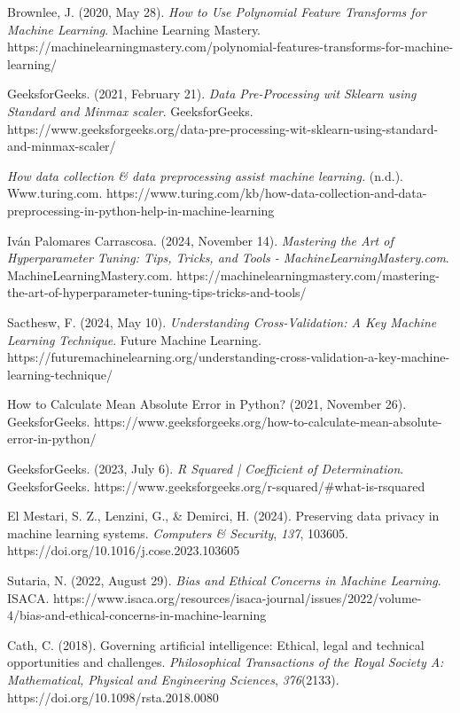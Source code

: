 \documentclass[10pt,twocolumn]{article}
\begin{document}
\cite{14} Brownlee, J. (2020, May 28). \textit{How to Use Polynomial Feature Transforms for Machine Learning}. Machine Learning Mastery. https://machinelearningmastery.com/polynomial-features-transforms-for-machine-learning/

\cite{15} GeeksforGeeks. (2021, February 21). \textit{Data Pre-Processing wit Sklearn using Standard and Minmax scaler}. GeeksforGeeks. https://www.geeksforgeeks.org/data-pre-processing-wit-sklearn-using-standard-and-minmax-scaler/

\cite{16} \textit{How data collection \& data preprocessing assist machine learning.} (n.d.). Www.turing.com. https://www.turing.com/kb/how-data-collection-and-data-preprocessing-in-python-help-in-machine-learning

\cite{17} Iván Palomares Carrascosa. (2024, November 14). \textit{Mastering the Art of Hyperparameter Tuning: Tips, Tricks, and Tools - MachineLearningMastery.com}. MachineLearningMastery.com. https://machinelearningmastery.com/mastering-the-art-of-hyperparameter-tuning-tips-tricks-and-tools/

\cite{18} Sacthesw, F. (2024, May 10). \textit{Understanding Cross-Validation: A Key Machine Learning Technique}. Future Machine Learning. https://futuremachinelearning.org/understanding-cross-validation-a-key-machine-learning-technique/

\cite{19} How to Calculate Mean Absolute Error in Python? (2021, November 26). GeeksforGeeks. https://www.geeksforgeeks.org/how-to-calculate-mean-absolute-error-in-python/

\cite{20} GeeksforGeeks. (2023, July 6). \textit{R Squared | Coefficient of Determination}. GeeksforGeeks. https://www.geeksforgeeks.org/r-squared/\#what-is-rsquared

\cite{21} El Mestari, S. Z., Lenzini, G., \& Demirci, H. (2024). Preserving data privacy in machine learning systems. \textit{Computers \& Security}, \textit{137}, 103605. https://doi.org/10.1016/j.cose.2023.103605

\cite{22} Sutaria, N. (2022, August 29). \textit{Bias and Ethical Concerns in Machine Learning}. ISACA. https://www.isaca.org/resources/isaca-journal/issues/2022/volume-4/bias-and-ethical-concerns-in-machine-learning

\cite{23} Cath, C. (2018). Governing artificial intelligence: Ethical, legal and technical opportunities and challenges. \textit{Philosophical Transactions of the Royal Society A: Mathematical, Physical and Engineering Sciences}, \textit{376}(2133). https://doi.org/10.1098/rsta.2018.0080
\end{document}

